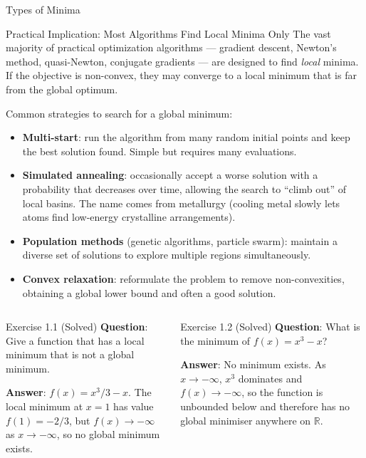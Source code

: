 \documentclass[aspectratio=169,10pt]{beamer}
\newcommand{\R}{\mathbb{R}}
\begin{document}
\begin{frame}[allowframebreaks]{Types of Minima}
  \vspace{0.3em}

  \begin{alertblock}{Practical Implication: Most Algorithms Find Local Minima Only}
    The vast majority of practical optimization algorithms --- gradient descent,
    Newton's method, quasi-Newton, conjugate gradients --- are designed to find
    \emph{local} minima.  If the objective is non-convex, they may converge to a
    local minimum that is far from the global optimum.

    \medskip
    Common strategies to search for a global minimum:
    \begin{itemize}
      \item \textbf{Multi-start}: run the algorithm from many random initial
        points and keep the best solution found.  Simple but requires many evaluations.
      \item \textbf{Simulated annealing}: occasionally accept a worse solution
        with a probability that decreases over time, allowing the search to
        ``climb out'' of local basins.  The name comes from metallurgy (cooling
        metal slowly lets atoms find low-energy crystalline arrangements).
      \item \textbf{Population methods} (genetic algorithms, particle swarm):
        maintain a diverse set of solutions to explore multiple regions simultaneously.
      \item \textbf{Convex relaxation}: reformulate the problem to remove
        non-convexities, obtaining a global lower bound and often a good solution.
    \end{itemize}
  \end{alertblock}

  \begin{columns}[T]
      \begin{exampleblock}{Exercise 1.1 (Solved)}
        \textbf{Question}: Give a function that has a local minimum that is
        not a global minimum.

        \medskip
        \textbf{Answer}: $f(x) = x^3/3 - x$.
        The local minimum at $x=1$ has value $f(1) = -2/3$, but
        $f(x) \to -\infty$ as $x \to -\infty$, so no global minimum exists.
      \end{exampleblock}

      \begin{exampleblock}{Exercise 1.2 (Solved)}
        \textbf{Question}: What is the minimum of $f(x) = x^3 - x$?

        \medskip
        \textbf{Answer}: No minimum exists.  As $x \to -\infty$,
        $x^3$ dominates and $f(x) \to -\infty$, so the function is unbounded
        below and therefore has no global minimiser anywhere on $\R$.
      \end{exampleblock}
  \end{columns}

\end{frame}
\end{document}
